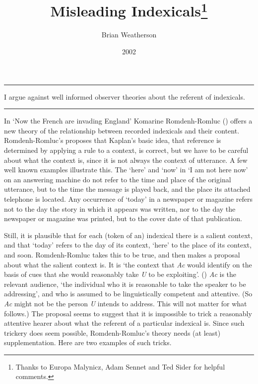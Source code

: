 \documentclass[
  10pt,
  letterpaper,
  DIV=11,
  numbers=noendperiod,
  twoside]{scrartcl}
\title{Misleading Indexicals\thanks{Thanks to Europa Malynicz, Adam
Sennet and Ted Sider for helpful comments.}}
\author{Brian Weatherson}
\date{2002}
\renewenvironment{abstract}
 {\vspace{-1.25cm}
 \quotation\small\noindent\rule{\linewidth}{.5pt}\par\smallskip
 \noindent }
 {\par\noindent\rule{\linewidth}{.5pt}\endquotation}
\begin{document}
\maketitle
\begin{abstract}
I argue against well informed observer theories about the referent of
indexicals.
\end{abstract}


In `Now the French are invading England' Komarine Romdenh-Romluc
() offers a new theory of the relationship
between recorded indexicals and their content. Romdenh-Romluc's proposes
that Kaplan's basic idea, that reference is determined by applying a
rule to a context, is correct, but we have to be careful about what the
context is, since it is not always the context of utterance. A few well
known examples illustrate this. The `here' and `now' in `I am not here
now' on an answering machine do not refer to the time and place of the
original utterance, but to the time the message is played back, and the
place its attached telephone is located. Any occurrence of `today' in a
newspaper or magazine refers not to the day the story in which it
appears was written, nor to the day the newspaper or magazine was
printed, but to the cover date of that publication.

Still, it is plausible that for each (token of an) indexical there is a
salient context, and that `today' refers to the day of its context,
`here' to the place of its context, and soon. Romdenh-Romluc takes this
to be true, and then makes a proposal about what the salient context is.
It is `the context that \emph{Ac} would identify on the basis of cues
that she would reasonably take \emph{U} to be exploiting'.
() \emph{Ac} is the relevant audience,
`the individual who it is reasonable to take the speaker to be
addressing', and who is assumed to be linguistically competent and
attentive. (So \emph{Ac} might not be the person \emph{U} intends to
address. This will not matter for what follows.) The proposal seems to
suggest that it is impossible to trick a reasonably attentive hearer
about what the referent of a particular indexical is. Since such
trickery does seem possible, Romdenh-Romluc's theory needs (at least)
supplementation. Here are two examples of such tricks.
\end{document}
